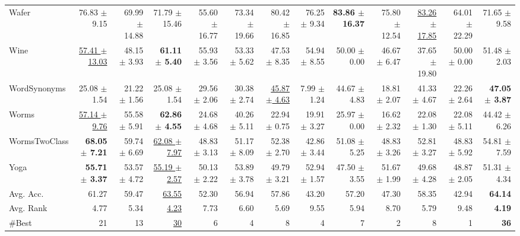 \begin{landscape}
\begin{longtable}{lrrrrrrrrrrrr}
Wafer & 76.83 $\pm$ 9.15 & 69.99 $\pm$ 14.88 & 71.79 $\pm$ 15.46 & 55.60 $\pm$ 16.77 & 73.34 $\pm$ 19.66 & 80.42 $\pm$ 16.85 & 76.25 $\pm$ 9.34 & \textbf{83.86 $\pm$ 16.37} & 75.80 $\pm$ 12.54 & \underline{83.26 $\pm$ 17.85} & 64.01 $\pm$ 22.29 & 71.65 $\pm$ 9.58 \\
Wine & \underline{57.41 $\pm$ 13.03} & 48.15 $\pm$ 3.93 & \textbf{61.11 $\pm$ 5.40} & 55.93 $\pm$ 3.56 & 53.33 $\pm$ 5.62 & 47.53 $\pm$ 8.35 & 54.94 $\pm$ 8.55 & 50.00 $\pm$ 0.00 & 46.67 $\pm$ 6.47 & 37.65 $\pm$ 19.80 & 50.00 $\pm$ 0.00 & 51.48 $\pm$ 2.03 \\
WordSynonyms & 25.08 $\pm$ 1.54 & 21.22 $\pm$ 1.56 & 25.08 $\pm$ 1.54 & 29.56 $\pm$ 2.06 & 30.38 $\pm$ 2.74 & \underline{45.87 $\pm$ 4.63} & 7.99 $\pm$ 1.24 & 44.67 $\pm$ 4.83 & 18.81 $\pm$ 2.07 & 41.33 $\pm$ 4.67 & 22.26 $\pm$ 2.64 & \textbf{47.05 $\pm$ 3.87} \\
Worms & \underline{57.14 $\pm$ 9.76} & 55.58 $\pm$ 5.91 & \textbf{62.86 $\pm$ 4.55} & 24.68 $\pm$ 4.68 & 40.26 $\pm$ 5.11 & 22.94 $\pm$ 0.75 & 19.91 $\pm$ 3.27 & 25.97 $\pm$ 0.00 & 16.62 $\pm$ 2.32 & 22.08 $\pm$ 1.30 & 22.08 $\pm$ 5.11 & 44.42 $\pm$ 6.26 \\
WormsTwoClass & \textbf{68.05 $\pm$ 7.21} & 59.74 $\pm$ 6.69 & \underline{62.08 $\pm$ 7.97} & 48.83 $\pm$ 3.13 & 51.17 $\pm$ 8.09 & 52.38 $\pm$ 2.70 & 42.86 $\pm$ 3.44 & 51.08 $\pm$ 5.25 & 48.83 $\pm$ 3.26 & 52.81 $\pm$ 3.27 & 48.83 $\pm$ 5.92 & 54.81 $\pm$ 7.59 \\
Yoga & \textbf{55.71 $\pm$ 3.37} & 53.57 $\pm$ 4.72 & \underline{55.19 $\pm$ 2.57} & 50.13 $\pm$ 2.22 & 53.89 $\pm$ 3.78 & 49.79 $\pm$ 3.21 & 52.94 $\pm$ 1.57 & 47.50 $\pm$ 3.55 & 51.67 $\pm$ 1.99 & 49.68 $\pm$ 4.28 & 48.87 $\pm$ 2.05 & 51.31 $\pm$ 4.34 \\
\midrule
Avg. Acc. & 61.27 & 59.47 & \underline{63.55} & 52.30 & 56.94 & 57.86 & 43.20 & 57.20 & 47.30 & 58.35 & 42.94 & \textbf{64.14} \\
Avg. Rank & 4.77 & 5.34 & \underline{4.23} & 7.73 & 6.60 & 5.69 & 9.55 & 5.94 & 8.70 & 5.79 & 9.48 & \textbf{4.19} \\
\#Best & 21 & 13 & \underline{30} & 6 & 4 & 8 & 4 & 7 & 2 & 8 & 1 & \textbf{36} \\
\end{longtable}
\endgroup
\end{landscape}
